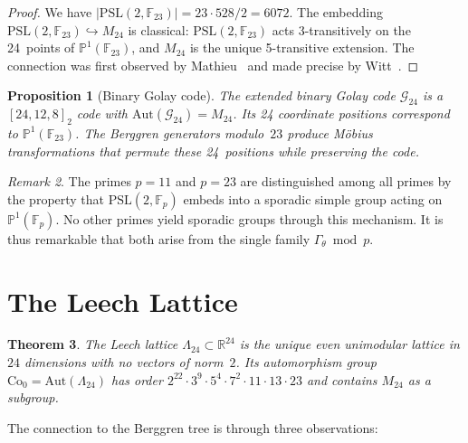 \documentclass[12pt]{amsart}
\newtheorem{theorem}{Theorem}[section]
\newtheorem{proposition}[theorem]{Proposition}
\theoremstyle{definition}
\theoremstyle{remark}
\newtheorem{remark}[theorem]{Remark}
\newcommand{\PSL}{\mathrm{PSL}}
\newcommand{\Aut}{\mathrm{Aut}}
\newcommand{\Fp}{\mathbb{F}_p}
\newcommand{\R}{\mathbb{R}}
\newcommand{\PP}{\mathbb{P}}
\newcommand{\Gtheta}{\Gamma_\theta}
\begin{document}
\begin{proof}
We have $|\PSL(2,\mathbb{F}_{23})| = 23 \cdot 528/2 = 6072$.  The
embedding $\PSL(2,\mathbb{F}_{23}) \hookrightarrow M_{24}$ is
classical: $\PSL(2,\mathbb{F}_{23})$ acts 3-transitively on the
24~points of $\PP^1(\mathbb{F}_{23})$, and $M_{24}$ is the unique
5-transitive extension.  The connection was first observed by
Mathieu~\cite{mathieu} and made precise by Witt~\cite{witt}.
\end{proof}

\begin{proposition}[Binary Golay code]\label{prop:golay24}
The extended binary Golay code $\mathcal{G}_{24}$ is a
$[24, 12, 8]_2$ code with $\Aut(\mathcal{G}_{24}) = M_{24}$.
Its 24 coordinate positions correspond to $\PP^1(\mathbb{F}_{23})$.
The Berggren generators modulo~$23$ produce M\"obius transformations
that permute these 24~positions while preserving the code.
\end{proposition}

\begin{remark}
The primes $p = 11$ and $p = 23$ are distinguished among all primes
by the property that $\PSL(2,\Fp)$ embeds into a sporadic simple group
acting on $\PP^1(\Fp)$.  No other primes yield sporadic groups through
this mechanism.  It is thus remarkable that both arise from the single
family $\Gtheta \bmod p$.
\end{remark}

\section{The Leech Lattice}\label{sec:leech}

\begin{theorem}\label{thm:leech}
The Leech lattice $\Lambda_{24} \subset \R^{24}$ is the unique
even unimodular lattice in $24$ dimensions with no vectors of
norm~$2$.  Its automorphism group $\mathrm{Co}_0 = \Aut(\Lambda_{24})$
has order $2^{22}\cdot 3^9\cdot 5^4\cdot 7^2\cdot 11\cdot 13\cdot 23$
and contains $M_{24}$ as a subgroup.
\end{theorem}

The connection to the Berggren tree is through three observations:
\end{document}
